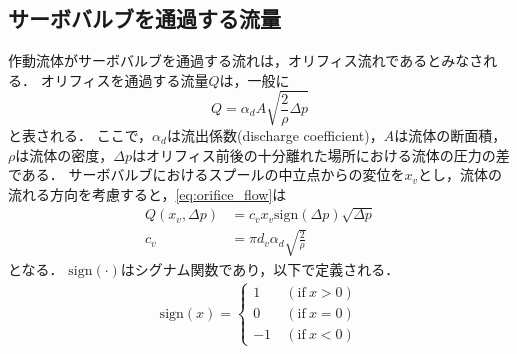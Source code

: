 \subsection{サーボバルブを通過する流量}
作動流体がサーボバルブを通過する流れは，オリフィス流れであるとみなされる．
オリフィスを通過する流量$Q$は，一般に
\begin{equation}
    Q = \alpha_d A \sqrt{\frac{2}{\rho}\Delta p}
    \label{eq:orifice_flow}
\end{equation}
と表される．
ここで，$\alpha_d$は流出係数(discharge coefficient)，$A$は流体の断面積，$\rho$は流体の密度，$\Delta p$はオリフィス前後の十分離れた場所における流体の圧力の差である．
サーボバルブにおけるスプールの中立点からの変位を$x_v$とし，流体の流れる方向を考慮すると，\eqnname\ref{eq:orifice_flow}は
\begin{align}
    \label{eq:orifice_valve}
    Q(x_v,\Delta p)&= c_vx_v\mathrm{sign}(\Delta p)\sqrt{\Delta p}\\
    c_v &= \pi d_v \alpha_d\sqrt{\frac{2}{\rho}}
\end{align}
となる．
$\mathrm{sign}(\cdot)$はシグナム関数であり，以下で定義される．
\begin{align}
    \label{eq:function_sign}
    \mathrm{sign}(x) = 
    \begin{cases}
        1~&(\mathrm{if}~x>0)\\
        0~&(\mathrm{if}~x=0)\\
        -1~&(\mathrm{if}~x<0)
    \end{cases}
\end{align}


